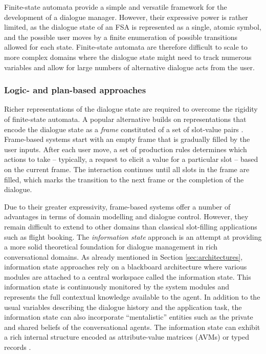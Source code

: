 Finite-state automata provide a simple and versatile framework for the development of a dialogue manager. However, their expressive power is rather limited, as the dialogue state of an FSA is represented as a single, atomic symbol, and the possible user moves by a finite enumeration of possible transitions allowed for each state.  Finite-state automata are therefore difficult to scale to more complex domains where the dialogue state might need to track numerous variables and allow for large numbers of alternative dialogue acts from the user.  

\subsubsection*{Logic- and plan-based approaches}

Richer representations of the dialogue state are required to overcome the rigidity of finite-state automata. A popular alternative builds on representations that encode the dialogue state as a \textit{frame} constituted of a set of slot-value pairs \citep{seneff2000}.  Frame-based systems start with an empty frame that is gradually filled by the user inputs.  After each user move, a set of production rules determines which actions to take  -- typically, a request to elicit a value for a particular slot -- based on the current frame.  The interaction continues until all slots in the frame are filled, which marks the transition to the next frame or the completion of the dialogue. 

Due to their greater expressivity, frame-based systems offer a number of advantages in terms of domain modelling and dialogue control.  However, they remain difficult to extend to other domains than classical slot-filling applications such as flight booking.  The \textit{information state} approach \citep{Larsson:2000} is an attempt at providing a more solid theoretical foundation for dialogue management in rich conversational domains.  As already mentioned in Section \ref{sec:architectures}, information state approaches rely on a blackboard architecture where various modules are attached to a central workspace called the information state. This information state is continuously monitored by the system modules and represents the full contextual knowledge available to the agent. In addition to the usual variables describing the dialogue history and the application task, the information state can also incorporate ``mentalistic'' entities such as the private and shared beliefs of the conversational agents.  The information state can exhibit a rich internal structure encoded as attribute-value matrices (AVMs) or typed records  \citep{RobinCooper2012}. 

